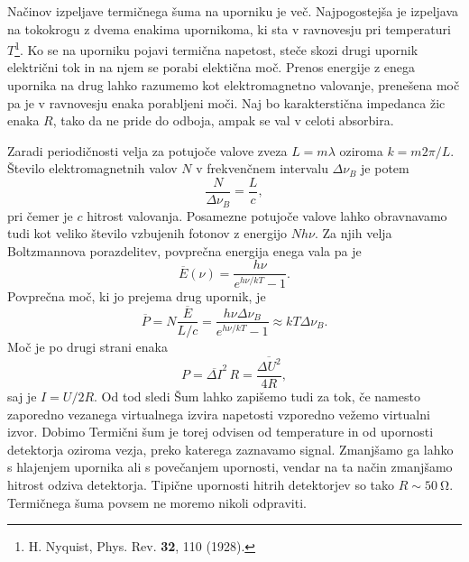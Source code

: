 Načinov izpeljave termičnega šuma na uporniku je več. Najpogostejša 
je izpeljava na tokokrogu z dvema enakima upornikoma, ki sta v ravnovesju
pri temperaturi $T$\footnote{H. Nyquist, Phys. Rev. {\bf 32}, 110 (1928).}. 
Ko se na uporniku pojavi termična napetost, steče skozi drugi upornik električni 
tok in na njem se porabi elektična moč. Prenos energije z enega upornika
na drug lahko razumemo kot elektromagnetno valovanje, prenešena moč pa
je v ravnovesju enaka porabljeni moči. Naj bo karakterstična impedanca
žic enaka $R$, tako da ne pride do odboja, ampak se val v celoti absorbira.

Zaradi periodičnosti velja za potujoče valove zveza $L = m \lambda$
oziroma $k = m 2\pi/L$. Število elektromagnetnih valov $N$ v frekvenčnem intervalu 
$\Delta\nu_B$ je potem 
\begin{equation}
\frac{N}{\Delta\nu_B} = \frac{L}{c},
\end{equation}
pri čemer je $c$ hitrost valovanja. Posamezne potujoče valove lahko obravnavamo
tudi kot veliko število vzbujenih fotonov z energijo $Nh\nu$. Za njih velja Boltzmannova
porazdelitev, povprečna energija enega vala pa je 
\begin{equation}
\overline{E}(\nu) = \frac{h \nu}{e^{h\nu/kT}-1}.
\end{equation}
Povprečna moč, ki jo prejema drug upornik, je
\begin{equation}
\overline{P} = N \frac{\overline{E}}{L/c}= \frac{h \nu \Delta \nu_B}{e^{h\nu/kT}-1}
\approx kT \Delta \nu_B.
\end{equation}
Moč je po drugi strani enaka
\begin{equation}
P = \overline{\Delta I}^2\,R = \frac{\overline{\Delta U^2}}{4R},
\end{equation}
saj je $I=U/2R$. Od tod sledi
Šum lahko zapišemo tudi za tok, če namesto zaporedno vezanega virtualnega 
izvira napetosti vzporedno vežemo virtualni izvor. Dobimo
Termični šum je torej odvisen od temperature in od upornosti detektorja oziroma
vezja, preko katerega zaznavamo signal. Zmanjšamo ga lahko s hlajenjem upornika
ali s povečanjem upornosti, vendar na ta način zmanjšamo hitrost odziva detektorja. 
Tipične upornosti hitrih detektorjev so tako $R \sim 50~\si{\ohm}$. Termičnega
šuma povsem ne moremo nikoli odpraviti. 

